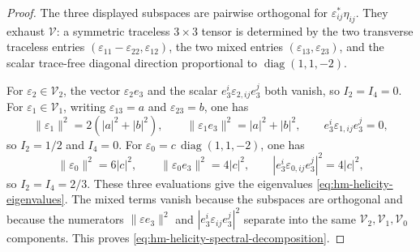 \begin{proof}
The three displayed subspaces are pairwise orthogonal for
\(\varepsilon^*_{ij}\eta_{ij}\).  They exhaust \(\mathcal V\): a symmetric
traceless \(3\times3\) tensor is determined by the two transverse traceless
entries \((\varepsilon_{11}-\varepsilon_{22},\varepsilon_{12})\), the two
mixed entries \((\varepsilon_{13},\varepsilon_{23})\), and the scalar trace-free
diagonal direction proportional to \(\operatorname{diag}(1,1,-2)\).

For \(\varepsilon_2\in\mathcal V_2\), the vector
\(\varepsilon_2 e_3\) and the scalar \(e_3^i\varepsilon_{2,ij}e_3^j\) both
vanish, so \(I_2=I_4=0\).  For
\(\varepsilon_1\in\mathcal V_1\), writing
\(\varepsilon_{13}=a\) and \(\varepsilon_{23}=b\), one has
\[
  \|\varepsilon_1\|^2=2(|a|^2+|b|^2),\qquad
  \|\varepsilon_1 e_3\|^2=|a|^2+|b|^2,\qquad
  e_3^i\varepsilon_{1,ij}e_3^j=0,
\]
so \(I_2=1/2\) and \(I_4=0\).  For
\(\varepsilon_0=c\,\operatorname{diag}(1,1,-2)\), one has
\[
  \|\varepsilon_0\|^2=6|c|^2,\qquad
  \|\varepsilon_0 e_3\|^2=4|c|^2,\qquad
  |e_3^i\varepsilon_{0,ij}e_3^j|^2=4|c|^2,
\]
so \(I_2=I_4=2/3\).  These three evaluations give the eigenvalues
\eqref{eq:hm-helicity-eigenvalues}.  The mixed terms vanish because the
subspaces are orthogonal and because the numerators
\(\|\varepsilon e_3\|^2\) and
\(|e_3^i\varepsilon_{ij}e_3^j|^2\) separate into the same
\(\mathcal V_2,\mathcal V_1,\mathcal V_0\) components.  This proves
\eqref{eq:hm-helicity-spectral-decomposition}.
\end{proof}

